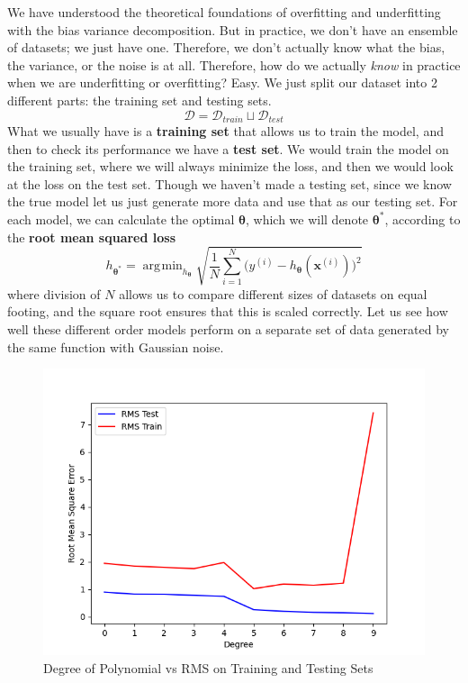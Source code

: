 \documentclass{article}
\DeclareMathOperator*{\argmin}{\arg\!\min}
\begin{document}
    We have understood the theoretical foundations of overfitting and underfitting with the bias variance decomposition. But in practice, we don't have an ensemble of datasets; we just have one. Therefore, we don't actually know what the bias, the variance, or the noise is at all. Therefore, how do we actually \textit{know} in practice when we are underfitting or overfitting? Easy. We just split our dataset into 2 different parts: the training set and testing sets. 
    \begin{equation}
      \mathcal{D} = \mathcal{D}_{train} \sqcup \mathcal{D}_{test}
    \end{equation}
    What we usually have is a \textbf{training set} that allows us to train the model, and then to check its performance we have a \textbf{test set}. We would train the model on the training set, where we will always minimize the loss, and then we would look at the loss on the test set. Though we haven't made a testing set, since we know the true model let us just generate more data and use that as our testing set. For each model, we can calculate the optimal $\boldsymbol{\theta}$, which we will denote $\boldsymbol{\theta}^\ast$, according to the \textbf{root mean squared loss}
    \begin{equation}
      h_{\boldsymbol{\theta}^\ast} = \argmin_{h_{\boldsymbol{\theta}}} \sqrt{ \frac{1}{N} \sum_{i=1}^N \big( y^{(i)} - h_{\boldsymbol{\theta}} (\mathbf{x}^{(i)}) \big)^2 }
    \end{equation}
    where division of $N$ allows us to compare different sizes of datasets on equal footing, and the square root ensures that this is scaled correctly. Let us see how well these different order models perform on a separate set of data generated by the same function with Gaussian noise. 

    \begin{figure}[H]
      \centering
      \includegraphics[scale=0.4]{img/Degree_vs_RMS.png}
      \caption{Degree of Polynomial vs RMS on Training and Testing Sets}
      \label{fig:poly_deg_vs_rms}
    \end{figure}
\end{document}
